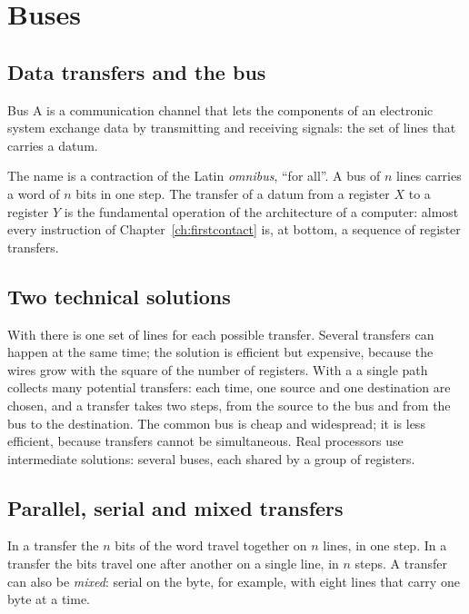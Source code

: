 \section{Buses}

\subsection{Data transfers and the bus}

\begin{definition}{Bus}
A  is a communication channel that lets the components of an
electronic system exchange data by transmitting and receiving signals: the set
of lines that carries a datum.
\end{definition}

The name is a contraction of the Latin \emph{omnibus}, ``for all''. A bus of
$n$ lines carries a word of $n$ bits in one step. The transfer of a datum
from a register $X$ to a register $Y$ is the fundamental operation of the
architecture of a computer: almost every instruction of
Chapter~\ref{ch:firstcontact} is, at bottom, a sequence of register transfers.

\subsection{Two technical solutions}

With  there is one set of lines for each possible
transfer. Several transfers can happen at the same time; the solution is
efficient but expensive, because the wires grow with the square of the number
of registers. With a  a single path collects many potential
transfers: each time, one source and one destination are chosen, and a
transfer takes two steps, from the source to the bus and from the bus to the
destination. The common bus is cheap and widespread; it is less efficient,
because transfers cannot be simultaneous. Real processors use intermediate
solutions: several buses, each shared by a group of registers.

\subsection{Parallel, serial and mixed transfers}

In a  transfer the $n$ bits of the word travel together on $n$
lines, in one step. In a  transfer the bits travel one after
another on a single line, in $n$ steps. A transfer can also be \emph{mixed}:
serial on the byte, for example, with eight lines that carry one byte at a
time.

